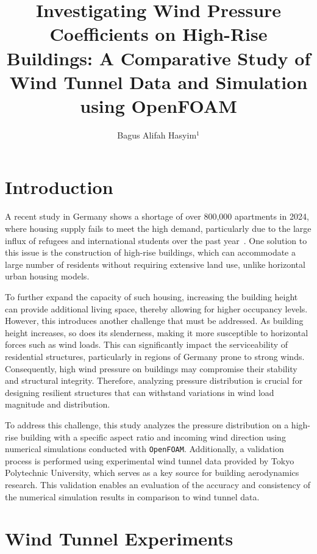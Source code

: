 \documentclass[12pt,a4paper]{cibb}
\title{\Large $\ $\\ \bf Investigating Wind Pressure Coefficients on High-Rise Buildings: A Comparative Study of Wind Tunnel Data and Simulation using OpenFOAM}
\author{\large Bagus Alifah Hasyim$^1$}
\begin{document}
\thispagestyle{myheadings}
\pagestyle{myheadings}


\section{\bf Introduction}
\label{sec:SCIENTIFIC-BACKGROUND}

A recent study in Germany shows a shortage of over 800,000 apartments in 2024, where housing supply fails to meet the high demand, particularly due to the large influx of refugees and international students over the past year~\cite{WWW-DWE}. One solution to this issue is the construction of high-rise buildings, which can accommodate a large number of residents without requiring extensive land use, unlike horizontal urban housing models. 

To further expand the capacity of such housing, increasing the building height can provide additional living space, thereby allowing for higher occupancy levels. However, this introduces another challenge that must be addressed. As building height increases, so does its slenderness, making it more susceptible to horizontal forces such as wind loads. This can significantly impact the serviceability of residential structures, particularly in regions of Germany prone to strong winds. Consequently, high wind pressure on buildings may compromise their stability and structural integrity. Therefore, analyzing pressure distribution is crucial for designing resilient structures that can withstand variations in wind load magnitude and distribution. 

To address this challenge, this study analyzes the pressure distribution on a high-rise building with a specific aspect ratio and incoming wind direction using numerical simulations conducted with \texttt{OpenFOAM}. Additionally, a validation process is performed using experimental wind tunnel data provided by Tokyo Polytechnic University, which serves as a key source for building aerodynamics research. This validation enables an evaluation of the accuracy and consistency of the numerical simulation results in comparison to wind tunnel data. 

\section{\bf Wind Tunnel Experiments}
\end{document}
